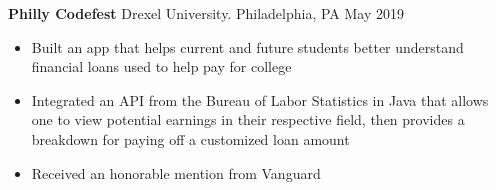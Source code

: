 \documentclass[10pt]{article}
\begin{document}


\textbf{Philly Codefest} Drexel University. Philadelphia, PA \hfill May 2019\par
\begin{itemize}
	\item Built an app that helps current and future students better understand financial loans used to help pay for college
	\item Integrated an API from the Bureau of Labor Statistics in Java that allows one to view potential earnings in their respective field, then provides a breakdown for paying off a customized loan amount
	\item Received an honorable mention from Vanguard
\end{itemize}


\end{document}
